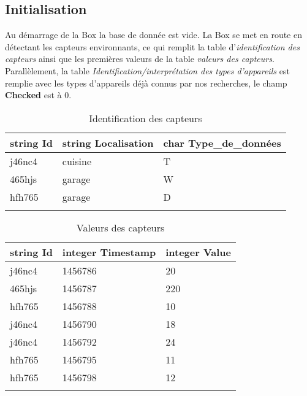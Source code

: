 \documentclass[10pt,a4paper]{article}
\begin{document}
\subsection{Initialisation}
Au démarrage de la Box la base de donnée est vide. La Box se met en route en détectant les capteurs environnants, ce qui remplit la table d'\textit{identification des capteurs} ainsi que les premières valeurs de la table\textit{ valeurs des capteurs}. Parallèlement, la table \textit{Identification/interprétation des types d'appareils} est remplie avec les types d'appareils déjà connus par nos recherches, le champ \textbf{Checked} est à 0. \\
\begin{table}[h!]
    \centering
    \begin{tabular}{|l|l|l|}
    \hline
    \rowcolor[HTML]{EFEFEF} 
    string Id & string Localisation & char Type\_de\_données \\ \hline
    j46nc4    & cuisine             & T                      \\ \hline
    465hjs    & garage              & W                      \\ \hline
    hfh765    & garage              & D                      \\ \hline
              &                     &                       
    \end{tabular}
    \caption{Identification des capteurs}
\end{table}

\begin{table}[h!]
\centering
    \begin{tabular}{|l|l|l|}
    \hline
    \rowcolor[HTML]{EFEFEF} 
    string Id & integer Timestamp & integer Value \\ \hline
    j46nc4    & 1456786           & 20            \\ \hline
    465hjs    & 1456787           & 220           \\ \hline
    hfh765    & 1456788           & 10            \\ \hline
    j46nc4    & 1456790           & 18            \\ \hline
    j46nc4    & 1456792           & 24            \\ \hline
    hfh765    & 1456795           & 11            \\ \hline
    hfh765    & 1456798           & 12            \\ \hline
              &                   &              
    \end{tabular}
    \caption{Valeurs des capteurs}
\end{table}
\end{document}
